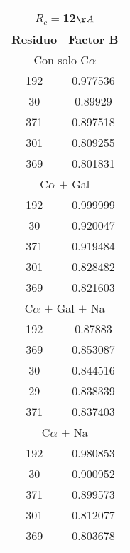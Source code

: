 \begin{tabular}[c]{|c|c|}
\multicolumn{2}{c}{$R_c=$12$\AA$}\\\hline
\textbf{Residuo}&\textbf{Factor B}\\\hline
\multicolumn{2}{c}{Con solo C$\alpha$}\\\hline
       192&  0.977536\\
        30&   0.89929\\
       371&  0.897518\\
       301&  0.809255\\
       369&  0.801831\\
\hline
\multicolumn{2}{c}{C$\alpha$ $+$ Gal}\\\hline
       192&  0.999999\\
        30&  0.920047\\
       371&  0.919484\\
       301&  0.828482\\
       369&  0.821603\\
\hline
\multicolumn{2}{c}{C$\alpha$ $+$ Gal $+$ Na}\\\hline
       192&   0.87883\\
       369&  0.853087\\
        30&  0.844516\\
        29&  0.838339\\
       371&  0.837403\\
\hline
\multicolumn{2}{c}{C$\alpha$ $+$ Na}\\\hline
       192&  0.980853\\
        30&  0.900952\\
       371&  0.899573\\
       301&  0.812077\\
       369&  0.803678\\
\hline
\end{tabular}
